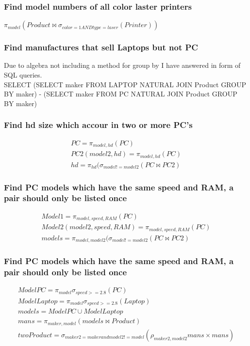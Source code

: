 \documentclass[12pt, a4paper]{article}
\begin{document}
				\subsubsection{Find model numbers of all color laster printers}
					$\pi_{model}(Product \bowtie \sigma_{color = 1 AND type = laser}(Printer))$
				\subsubsection{Find manufactures that sell Laptops but not PC}
					Due to algebra not including a method for group by I have answered in form of SQL queries.\\
					SELECT (SELECT maker FROM LAPTOP NATURAL JOIN Product GROUP BY maker)  -  (SELECT maker FROM PC NATURAL JOIN Product GROUP BY maker)
				\subsubsection{Find hd size which accour in two or more PC's}
					\begin{align*}
						PC = \pi_{model,hd}(PC)\\
						PC2(model2,hd) = \pi_{model,hd}(PC)\\
						hd = \pi_{hd}(\sigma_{model != model2}(PC \bowtie PC2)
					\end{align*}
				\subsubsection{Find PC models which have the same speed and RAM, a pair should only be listed once}
					\begin{align*}
						Model1 = \pi_{model,speed,RAM}(PC)\\
						Model2(model2,speed,RAM) = \pi_{model,speed,RAM}(PC)\\
						models = \pi_{model,model2}(\sigma_{model != model2}(PC \bowtie PC2)
 					\end{align*}			
				\subsubsection{Find PC models which have the same speed and RAM, a pair should only be listed once}
					\begin{align*}
						ModelPC = \pi_{model}\sigma_{speed >= 2.8}(PC)\\
						ModelLaptop = \pi_{model}\sigma_{speed >= 2.8}(Laptop)\\
						models = ModelPC \cup ModelLaptop\\
						mans = \pi_{maker,model}(models \bowtie Product)\\
						twoProduct = \sigma_{maker2 = maker and model2 != model}(\rho_{maker2,model2}mans \times mans)
 					\end{align*}			
\end{document}

